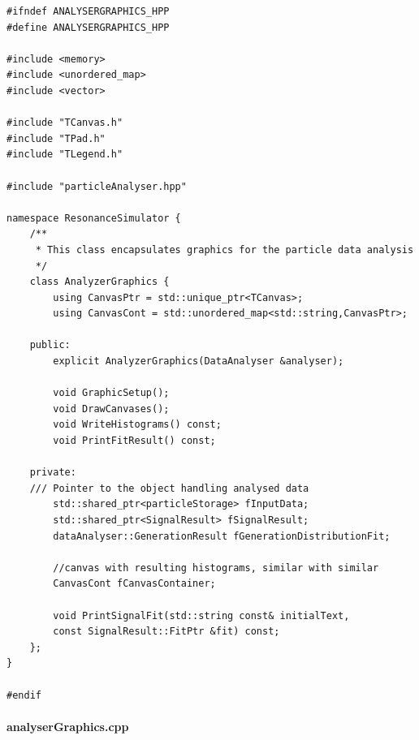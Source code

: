 \documentclass[12pt, a4paper]{article}
\begin{document}
\begin{verbatim}
#ifndef ANALYSERGRAPHICS_HPP
#define ANALYSERGRAPHICS_HPP

#include <memory>
#include <unordered_map>
#include <vector>

#include "TCanvas.h"
#include "TPad.h"
#include "TLegend.h"

#include "particleAnalyser.hpp"

namespace ResonanceSimulator {
    /**
     * This class encapsulates graphics for the particle data analysis
     */
    class AnalyzerGraphics {
        using CanvasPtr = std::unique_ptr<TCanvas>;
        using CanvasCont = std::unordered_map<std::string,CanvasPtr>;

    public:
        explicit AnalyzerGraphics(DataAnalyser &analyser);

        void GraphicSetup();
        void DrawCanvases();
        void WriteHistograms() const;
        void PrintFitResult() const;

    private:
    /// Pointer to the object handling analysed data
        std::shared_ptr<particleStorage> fInputData; 
        std::shared_ptr<SignalResult> fSignalResult;
        dataAnalyser::GenerationResult fGenerationDistributionFit;

        //canvas with resulting histograms, similar with similar
        CanvasCont fCanvasContainer;

        void PrintSignalFit(std::string const& initialText, 
        const SignalResult::FitPtr &fit) const;
    };
}

#endif 
\end{verbatim}

\paragraph{analyserGraphics.cpp}
\end{document}
